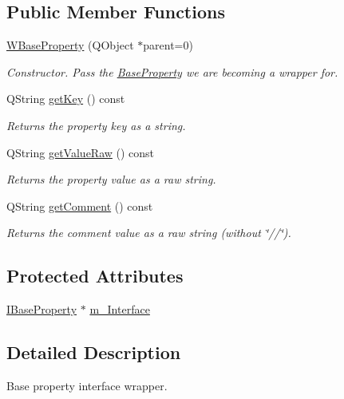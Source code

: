 \subsection*{Public Member Functions}
\begin{DoxyCompactItemize}
\item 
\hyperlink{class_w_base_property_a5f0a0f4e3f342d82ac9c9c45cb374c29}{W\-Base\-Property} (Q\-Object $\ast$parent=0)
\begin{DoxyCompactList}\small\item\em Constructor. Pass the \hyperlink{class_base_property}{Base\-Property} we are becoming a wrapper for. \end{DoxyCompactList}\item 
Q\-String \hyperlink{class_w_base_property_a4c0e55c7b0a19a7685b30a985b72524a}{get\-Key} () const 
\begin{DoxyCompactList}\small\item\em Returns the property key as a string. \end{DoxyCompactList}\item 
Q\-String \hyperlink{class_w_base_property_a49ba3186114cd7a0bb730a1a703af1eb}{get\-Value\-Raw} () const 
\begin{DoxyCompactList}\small\item\em Returns the property value as a raw string. \end{DoxyCompactList}\item 
Q\-String \hyperlink{class_w_base_property_a60750f9c78b6cbd7ec3fc1bfa9ae53fe}{get\-Comment} () const 
\begin{DoxyCompactList}\small\item\em Returns the comment value as a raw string (without \char`\"{}//\char`\"{}). \end{DoxyCompactList}\end{DoxyCompactItemize}
\subsection*{Protected Attributes}
\begin{DoxyCompactItemize}
\item 
\hyperlink{class_i_base_property}{I\-Base\-Property} $\ast$ \hyperlink{class_w_base_property_a8c25b5b13019cf65037147da7b03c643}{m\-\_\-\-Interface}
\end{DoxyCompactItemize}


\subsection{Detailed Description}
Base property interface wrapper. 

